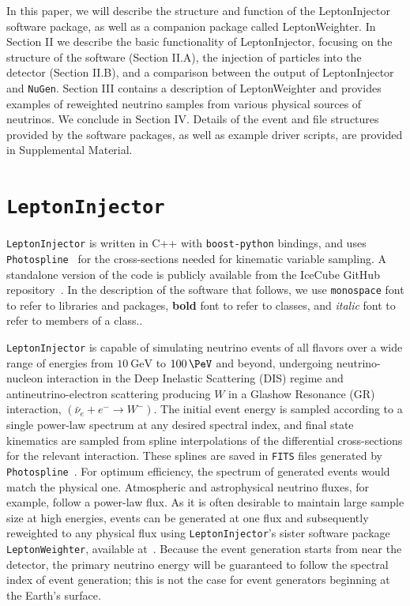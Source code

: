 \documentclass[main.tex]{subfiles}
\newcommand{\LeptonInjector}{\texttt{LeptonInjector}}
\newcommand{\LeptonWeighter}{\texttt{LeptonWeighter}}
\newcommand{\NuGen}{\texttt{NuGen}}
\newcommand{\PHOTOSPLINE}{\texttt{Photospline}}
\newcommand{\boostpython}{\texttt{boost-python}}
\begin{document}
In this paper, we will describe the structure and function of the LeptonInjector software package, as well as a companion package called LeptonWeighter.
In Section II we describe the basic functionality of LeptonInjector, focusing on the structure of the software (Section II.A), the injection of particles into the detector (Section II.B), and a comparison between the output of LeptonInjector and \NuGen{}.
Section III contains a description of LeptonWeighter and provides examples of reweighted neutrino samples from various physical sources of neutrinos.
We conclude in Section IV.
Details of the event and file structures provided by the software packages, as well as example driver scripts, are provided in Supplemental Material.

\section{\LeptonInjector\label{sec:overview}}

\LeptonInjector{} is written in {\ttf C++} with \boostpython{} bindings, and uses \PHOTOSPLINE~\cite{WHITEHORN20132214} for the cross-sections needed for kinematic variable sampling.
A standalone version of the code is publicly available from the IceCube GitHub repository~\cite{LeptonInjectorRepository}.
In the description of the software that follows, we use \texttt{monospace} font to refer to libraries and packages, \textbf{bold} font to refer to classes, and \textit{italic} font to refer to members of a class..

\LeptonInjector{} is capable of simulating neutrino events of all flavors over a wide range of energies from $\SI{10}\GeV$ to $\SI{100}\PeV$ and beyond, undergoing neutrino-nucleon interaction in the Deep Inelastic Scattering (DIS) regime and antineutrino-electron scattering producing $W$ in a Glashow Resonance (GR) interaction, $(\bar{\nu}_{e}+e^{-} \to W^{-})$.
The initial event energy is sampled according to a single power-law spectrum at any desired spectral index, and final state kinematics are sampled from spline interpolations of the differential cross-sections for the relevant interaction.
These splines are saved in \texttt{FITS} files generated by \PHOTOSPLINE~\cite{WHITEHORN20132214}.
For optimum efficiency, the spectrum of generated events would match the physical one.
Atmospheric and astrophysical neutrino fluxes, for example, follow a power-law flux.
As it is often desirable to maintain large sample size at high energies, events can be generated at one flux and subsequently reweighted to any physical flux using \LeptonInjector{}'s sister software package \LeptonWeighter{}, available at~\cite{LeptonWeighterRepository}.
Because the event generation starts from near the detector, the primary neutrino energy will be guaranteed to follow the spectral index of event generation; this is not the case for event generators beginning at the Earth's surface.
\end{document}
